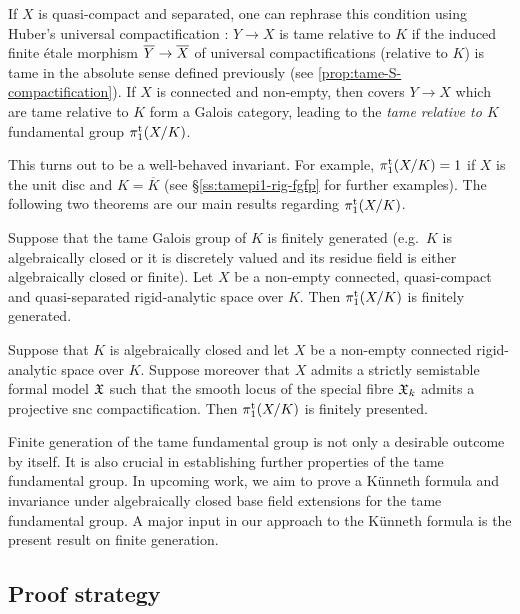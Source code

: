 If $X$ is quasi-compact and separated, one can rephrase this condition using Huber's universal compactification \cite[\S 5.1]{HuberBook}: $Y\to X$ is tame relative to $K$ if the induced finite \'etale morphism $\overline{Y}\to\overline{X}$ of universal compactifications (relative to $K$)  is tame in the absolute sense defined previously (see \cref{prop:tame-S-compactification}). If $X$ is connected and non-empty, then covers $Y\to X$ which are tame relative to $K$ form a Galois category, leading to the \textit{tame relative to $K$} fundamental group $\pi_1^{\mathrm{t}}(X/K)$. 

This turns out to be a well-behaved invariant. For example, $\pi_1^{\mathrm{t}}(X/K)=1$ if $X$ is the unit disc and $K=\overline{K}$ (see \S\ref{ss:tamepi1-rig-fgfp} for further examples).  The following two theorems are our main results regarding $\pi_1^{\mathrm{t}}(X/K)$.

\begin{thmABC} \label{thmABC:analytic pi1tame fg}
    Suppose that the tame Galois group of $K$ is finitely generated (e.g.\ $K$ is algebraically closed or it is discretely valued and its residue field is either algebraically closed or finite). Let $X$ be a non-empty connected, quasi-compact and quasi-separated rigid-analytic space over $K$. 
    Then $\pi_1^{\mathrm{t}}(X/K)$ is finitely generated.
\end{thmABC}

\begin{thmABC} \label{thmABC:analytic pi1tame fp}
    Suppose that $K$ is algebraically closed and let $X$ be a non-empty connected rigid-analytic space over $K$. Suppose moreover that $X$ admits a strictly semistable formal model ${\mathfrak{X}}$ such that the smooth locus of the special fibre ${\mathfrak{X}}_k$ admits a projective snc compactification. Then $\pi_1^{\mathrm{t}}(X/K)$ is finitely presented. 
\end{thmABC}

Finite generation of the tame fundamental group is not only a desirable outcome by itself.
It is also crucial in establishing further properties of the tame fundamental group.
In upcoming work, we aim to prove a Künneth formula and invariance under algebraically closed base field extensions for the tame fundamental group.
A major input in our approach to the Künneth formula is the present result on finite generation.


\subsection*{Proof strategy}

